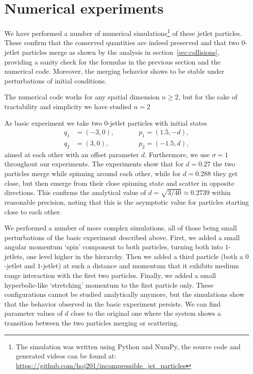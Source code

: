 \documentclass[12pt]{amsart}
\begin{document}
\section{Numerical experiments}
\label{sec:Numerical experiments}

We have performed a number of numerical simulations\footnote{%
  The simulation was written using Python and NumPy, the source code
  and generated videos can be found at:
  \url{https://github.com/hoj201/incompressible_jet_particles}%
} of these jetlet particles. These confirm that the conserved
quantities are indeed preserved and that two $0$-jetlet particles
merge as shown by the analysis in section~\ref{sec:collisions},
providing a sanity check for the formulas in the previous section and
the numerical code. Moreover, the merging behavior shows to be stable
under perturbations of initial conditions.

The numerical code works for any spatial dimension $n \ge 2$, but for
the sake of tractability and simplicity we have studied $n = 2$ 

As basic experiment we take two $0$-jetlet particles with initial
states
\begin{equation}\label{eq:exp1-initial}
  \begin{alignedat}{2}
    q_1 &= (-3, 0), &\qquad& p_1 = ( 1.5,-d), \\
    q_2 &= ( 3, 0), &      & p_2 = (-1.5, d),
  \end{alignedat}
\end{equation}
aimed at each other with an offset parameter $d$. Furthermore, we use
$\sigma = 1$ throughout our experiments. The experiments show that for
$d = 0.27$ the two particles merge while spinning around each other,
while for $d = 0.288$ they get close, but then emerge from their close
spinning state and scatter in opposite directions. This confirms the
analytical value of $d = \sqrt{3/40} \approx 0.2739$ within reasonable
precision, noting that this is the asymptotic value for particles
starting close to each other.

We performed a number of more complex simulations, all of
those being small perturbations of the basic experiment described
above. First, we added a small angular momentum `spin' component to
both particles, turning both into $1$-jetlets, one level higher in the
hierarchy. Then we added a third particle (both a $0$-jetlet and
$1$-jetlet) at such a distance and momentum that it exhibits medium
range interaction with the first two particles. Finally, we added a
small hyperbolic-like `stretching' momentum to the first particle
only. These configurations cannot be studied analytically anymore, but
the simulations show that the behavior observed in the basic
experiment persists. We can find parameter values of $d$ close to the
original one where the system shows a transition between the two
particles merging or scattering.
\end{document}
